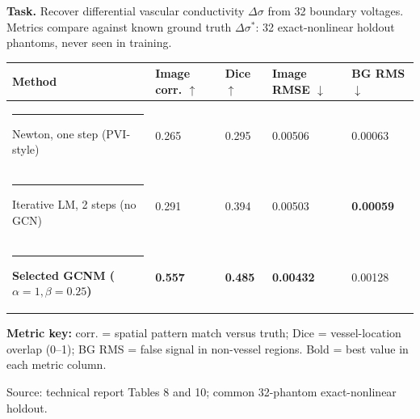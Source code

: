 \documentclass[border=6pt]{standalone}
\begin{document}
\begin{minipage}{18.2cm}

  \vspace{0.2em}
  {\small\color{srlNavy}\textbf{Task.} Recover differential vascular
  conductivity $\Delta\sigma$ from 32 boundary voltages. Metrics compare
  against known ground truth $\Delta\sigma^\ast$: 32 exact-nonlinear
  holdout phantoms, never seen in training.}

  \vspace{0.55em}
  \renewcommand{\arraystretch}{1.48}
  \setlength{\tabcolsep}{7pt}
  \begin{tabular}{@{}L{6.25cm}C{2.55cm}C{2.25cm}C{2.6cm}C{2.55cm}@{}}
    \toprule
    \textbf{Method} &
    \textbf{Image corr. $\uparrow$} &
    \textbf{Dice $\uparrow$} &
    \textbf{Image RMSE $\downarrow$} &
    \textbf{BG RMS $\downarrow$} \\
    \midrule
    \textcolor{baselineGray}{\rule{0.9em}{0.9em}}\enspace
      Newton, one step (PVI-style) & 0.265 & 0.295 & 0.00506 & 0.00063 \\
    \textcolor{physicsTeal}{\rule{0.9em}{0.9em}}\enspace
      Iterative LM, 2 steps (no GCN) & 0.291 & 0.394 & 0.00503 &
      \textbf{0.00059} \\
    \textcolor{learnedBlue}{\rule{0.9em}{0.9em}}\enspace
      \textbf{Selected GCNM ($\alpha=1,\beta=0.25$)} &
      \textbf{0.557} & \textbf{0.485} & \textbf{0.00432} & 0.00128 \\
    \bottomrule
  \end{tabular}


  \vspace{0.1em}
  {\footnotesize\color{baselineGray}
  \textbf{Metric key:} corr. = spatial pattern match versus truth;
  Dice = vessel-location overlap (0--1); BG RMS = false signal in
  non-vessel regions. Bold = best value in each metric column.}

  \vspace{0.25em}
  {\scriptsize\color{baselineGray}Source: technical report Tables 8 and 10;
  common 32-phantom exact-nonlinear holdout.}
\end{minipage}
\end{document}
